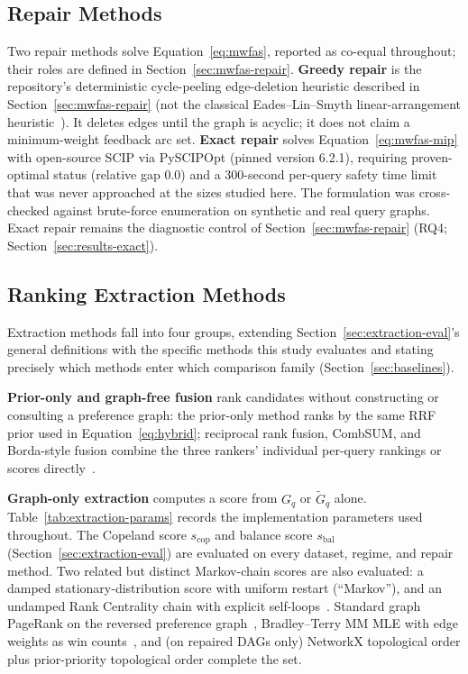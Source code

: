 \documentclass[pdflatex,sn-basic,Numbered]{sn-jnl}
\begin{document}
\subsection{Repair Methods}
\label{sec:repair-protocol}

Two repair methods solve Equation~\eqref{eq:mwfas}, reported as co-equal
throughout; their roles are defined in Section~\ref{sec:mwfas-repair}.
\textbf{Greedy repair} is the repository's deterministic cycle-peeling
edge-deletion heuristic described in Section~\ref{sec:mwfas-repair} (not
the classical Eades--Lin--Smyth linear-arrangement
heuristic~\cite{eades1993heuristic}). It deletes edges until the graph is
acyclic; it does not claim a minimum-weight feedback arc set.
\textbf{Exact repair} solves Equation~\eqref{eq:mwfas-mip} with open-source
SCIP via PySCIPOpt (pinned version 6.2.1), requiring proven-optimal status
(relative gap $0.0$) and a 300-second per-query safety time limit that was
never approached at the sizes studied here. The formulation was
cross-checked against brute-force enumeration on synthetic and real query
graphs. Exact repair remains the diagnostic control of
Section~\ref{sec:mwfas-repair} (RQ4; Section~\ref{sec:results-exact}).

\subsection{Ranking Extraction Methods}
\label{sec:extraction-methods}

Extraction methods fall into four groups, extending
Section~\ref{sec:extraction-eval}'s general definitions with the specific
methods this study evaluates and stating precisely which methods enter
which comparison family (Section~\ref{sec:baselines}).

\textbf{Prior-only and graph-free fusion} rank candidates without
constructing or consulting a preference graph: the prior-only method ranks
by the same RRF prior used in Equation~\eqref{eq:hybrid}; reciprocal rank
fusion, CombSUM, and Borda-style fusion combine the three rankers'
individual per-query rankings or scores
directly~\cite{cormack2009rrf,fox1994combination}.

\textbf{Graph-only extraction} computes a score from $G_q$ or
$\widetilde{G}_q$ alone. Table~\ref{tab:extraction-params} records the
implementation parameters used throughout. The Copeland score
$s_{\mathrm{cop}}$ and balance score $s_{\mathrm{bal}}$
(Section~\ref{sec:extraction-eval}) are evaluated on every dataset, regime,
and repair method. Two related but distinct Markov-chain scores are also
evaluated: a damped stationary-distribution score with uniform restart
(``Markov''), and an undamped Rank Centrality chain with explicit
self-loops~\cite{negahban2017rankcentrality}. Standard graph PageRank on
the reversed preference graph~\cite{page1999pagerank}, Bradley--Terry MM
MLE with edge weights as win
counts~\cite{bradley1952rank,hunter2004mm}, and (on repaired DAGs only)
NetworkX topological order plus prior-priority topological order complete
the set.
\end{document}
